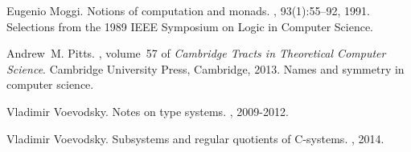 \documentclass[11pt]{article}
\begin{document}
\begin{thebibliography}{10}
Eugenio Moggi.
\newblock Notions of computation and monads.
, 93(1):55--92, 1991.
\newblock Selections from the 1989 IEEE Symposium on Logic in Computer Science.

Andrew~M. Pitts.
, volume~57 of {\em Cambridge Tracts in Theoretical
  Computer Science}.
\newblock Cambridge University Press, Cambridge, 2013.
\newblock Names and symmetry in computer science.

Vladimir Voevodsky.
\newblock Notes on type systems.
,
  2009-2012.

Vladimir Voevodsky.
\newblock Subsystems and regular quotients of {C-systems}.
, 2014.

\end{thebibliography}








%
%
\end{document}
